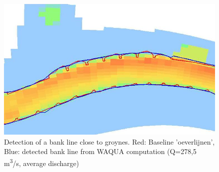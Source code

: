 \begin{figure}
\includegraphics[width=\textwidth]{figures/Fig3-3.png}
\caption{Detection of a bank line close to groynes.
Red: Baseline 'oeverlijnen', Blue: detected bank line from WAQUA computation (Q=278,5 m\textsuperscript{3}/s, average discharge)}
\label{Fig3.3}
\end{figure}